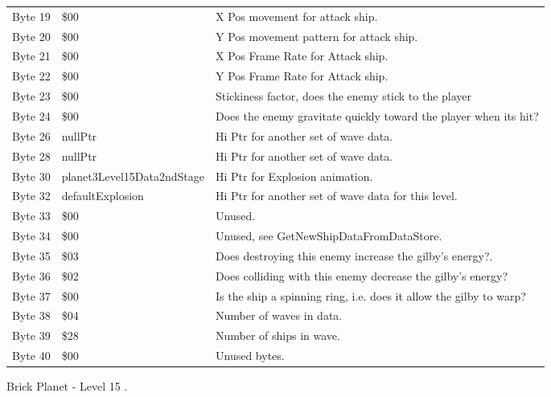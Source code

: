 \begin{figure}[H]
{\begin{adjustbox}{width=12cm}
\begin{tabular}{lll}
 Byte 19 & \$00                        & X Pos movement for attack ship.                                    \\
 Byte 20 & \$00                        & Y Pos movement pattern for attack ship.                            \\
 Byte 21 & \$00                        & X Pos Frame Rate for Attack ship.                                  \\
 Byte 22 & \$00                        & Y Pos Frame Rate for Attack ship.                                  \\
 Byte 23 & \$00                        & Stickiness factor, does the enemy stick to the player              \\
 Byte 24 & \$00                        & Does the enemy gravitate quickly toward the player when its hit?   \\
 Byte 26 & nullPtr                    & Hi Ptr for another set of wave data.                               \\
 Byte 28 & nullPtr                    & Hi Ptr for another set of wave data.                               \\
 Byte 30 & planet3Level15Data2ndStage & Hi Ptr for Explosion animation.                                    \\
 Byte 32 & defaultExplosion           & Hi Ptr for another set of wave data for this level.                \\
 Byte 33 & \$00                        & Unused.                                                            \\
 Byte 34 & \$00                        & Unused, see GetNewShipDataFromDataStore.                           \\
 Byte 35 & \$03                        & Does destroying this enemy increase the gilby's energy?.           \\
 Byte 36 & \$02                        & Does colliding with this enemy decrease the gilby's energy?        \\
 Byte 37 & \$00                        & Is the ship a spinning ring, i.e. does it allow the gilby to warp? \\
 Byte 38 & \$04                        & Number of waves in data.                                           \\
 Byte 39 & \$28                        & Number of ships in wave.                                           \\
 Byte 40 & \$00                        & Unused bytes.                                                      \\
\bottomrule
\end{tabular}

  \end{adjustbox}

  }\caption*{Brick Planet - Level 15
.}
\end{figure}

